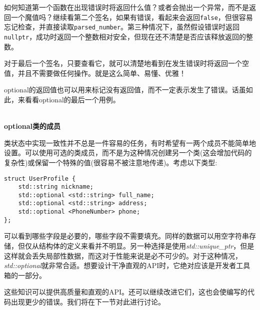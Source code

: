 如何知道第一个函数在出现错误时将返回什么值？或者会抛出一个异常，而不是返回一个魔值吗？继续看第二个签名，如果有错误，看起来会返回\texttt{false}，但很容易忘记检查，并直接读取\texttt{parsed\_number}。第三种情况下，虽然假设错误时返回\texttt{nullptr}，成功时返回一个整数相对安全，但现在还不清楚是否应该释放返回的整数。

对于最后一个签名，只要查看它，就可以清楚地看到在发生错误时将返回一个空值，并且不需要做任何操作。就是这么简单、易懂、优雅！

optional的返回值也可以用来标记没有返回值，而不一定表示发生了错误。话虽如此，来看看optional的最后一个用例。

\hspace*{\fill} \\ %
\noindent
\textbf{optional类的成员}

类状态中实现一致性并不总是一件容易的任务，有时希望有一两个成员不能简单地设置。可以使用可选的类成员，而不是为这种情况创建另一个类(这会增加代码的复杂性)或保留一个特殊的值(很容易不被注意地传递)。考虑以下类型:

\begin{lstlisting}[style=styleCXX]
struct UserProfile {
	std::string nickname;
	std::optional <std::string> full_name;
	std::optional <std::string> address;
	std::optional <PhoneNumber> phone;
};
\end{lstlisting}

可以看到哪些字段是必要的，哪些字段不需要填充。同样的数据可以用空字符串存储，但仅从结构体的定义来看并不明显。另一种选择是使用\textit{std::unique\_ptr}，但是这样就会丢失局部性数据，而这对于性能来说是必不可少的。对于这种情况，\textit{std::optional}就非常合适。想要设计干净直观的API时，它绝对应该是开发者工具箱的一部分。

这些知识可以提供高质量和直观的API。还可以继续改进它们，这也会使编写的代码出现更少的错误。我们将在下一节对此进行讨论。










